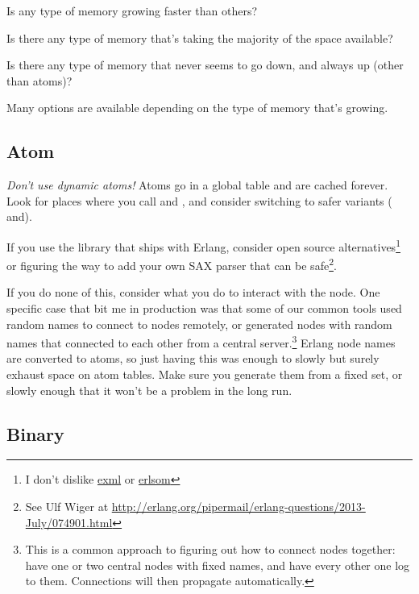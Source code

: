 \documentclass[11pt, oneside]{book}   	%
\begin{document}
\begin{itemize*}
	\item Is any type of memory growing faster than others?
	\item Is there any type of memory that's taking the majority of the space available?
	\item Is there any type of memory that never seems to go down, and always up (other than atoms)?
\end{itemize*}

Many options are available depending on the type of memory that's growing.

\subsection{Atom}

\emph{Don't use dynamic atoms!} Atoms go in a global table and are cached forever. Look for places where you call  and , and consider switching to safer variants ( and\newline {}).

If you use the  library that ships with Erlang, consider open source alternatives\footnote{I don't dislike \href{https://github.com/paulgray/exml}{exml} or \href{https://github.com/willemdj/erlsom}{erlsom}} or figuring the way to add your own SAX parser that can be safe\footnote{See Ulf Wiger at \href{http://erlang.org/pipermail/erlang-questions/2013-July/074901.html}{http://erlang.org/pipermail/erlang-questions/2013-July/074901.html}}. 

If you do none of this, consider what you do to interact with the node. One specific case that bit me in production was that some of our common tools used random names to connect to nodes remotely, or generated nodes with random names that connected to each other from a central server.\footnote{This is a common approach to figuring out how to connect nodes together: have one or two central nodes with fixed names, and have every other one log to them. Connections will then propagate automatically.} Erlang node names are converted to atoms, so just having this was enough to slowly but surely exhaust space on atom tables. Make sure you generate them from a fixed set, or slowly enough that it won't be a problem in the long run.

\subsection{Binary}
\end{document}
